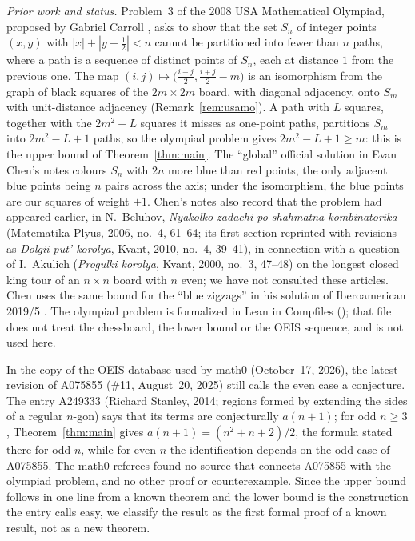 \documentclass[11pt]{amsart}
\theoremstyle{plain}
\theoremstyle{definition}
\begin{document}
\emph{Prior work and status.} Problem~3 of the 2008 USA Mathematical Olympiad, proposed by Gabriel Carroll \cite{ChenUSAMO}, asks to show that the set $S_n$ of integer points $(x,y)$ with $|x|+|y+\frac12|<n$ cannot be partitioned into fewer than $n$ paths, where a path is a sequence of distinct points of $S_n$, each at distance $1$ from the previous one. The map $(i,j)\mapsto\bigl(\frac{i-j}{2},\frac{i+j}{2}-m\bigr)$ is an isomorphism from the graph of black squares of the $2m\times2m$ board, with diagonal adjacency, onto $S_m$ with unit-distance adjacency (Remark~\ref{rem:usamo}). A path with $L$ squares, together with the $2m^2-L$ squares it misses as one-point paths, partitions $S_m$ into $2m^2-L+1$ paths, so the olympiad problem gives $2m^2-L+1\ge m$: this is the upper bound of Theorem~\ref{thm:main}. The ``global'' official solution in Evan Chen's notes \cite{ChenUSAMO} colours $S_n$ with $2n$ more blue than red points, the only adjacent blue points being $n$ pairs across the axis; under the isomorphism, the blue points are our squares of weight $+1$. Chen's notes also record that the problem had appeared earlier, in N.~Beluhov, \emph{Nyakolko zadachi po shahmatna kombinatorika} (Matematika Plyus, 2006, no.~4, 61--64; its first section reprinted with revisions as \emph{Dolgii put' korolya}, Kvant, 2010, no.~4, 39--41), in connection with a question of I.~Akulich (\emph{Progulki korolya}, Kvant, 2000, no.~3, 47--48) on the longest closed king tour of an $n\times n$ board with $n$ even; we have not consulted these articles. Chen uses the same bound for the ``blue zigzags'' in his solution of Iberoamerican 2019/5 \cite{ChenIbero}. The olympiad problem is formalized in Lean in Compfiles \cite{Compfiles} (); that file does not treat the chessboard, the lower bound or the OEIS sequence, and is not used here.

In the copy of the OEIS database used by math0 (October~17, 2026), the latest revision of A075855 (\#11, August~20, 2025) still calls the even case a conjecture. The entry A249333 \cite{A249333} (Richard Stanley, 2014; regions formed by extending the sides of a regular $n$-gon) says that its terms are conjecturally $a(n+1)$; for odd $n\ge3$, Theorem~\ref{thm:main} gives $a(n+1)=(n^2+n+2)/2$, the formula stated there for odd $n$, while for even $n$ the identification depends on the odd case of A075855. The math0 referees found no source that connects A075855 with the olympiad problem, and no other proof or counterexample. Since the upper bound follows in one line from a known theorem and the lower bound is the construction the entry calls easy, we classify the result as the first formal proof of a known result, not as a new theorem.
\end{document}
